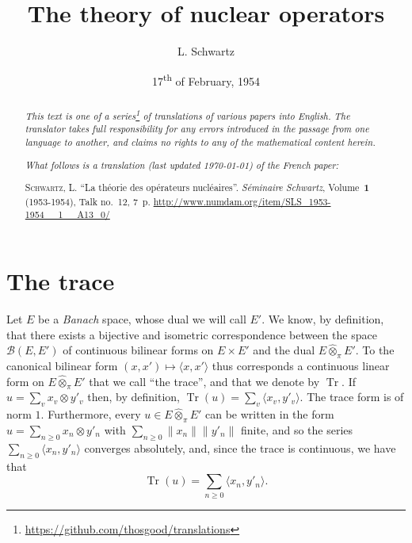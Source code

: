 \documentclass{article}
\title{The theory of nuclear operators}
\author{L. Schwartz}
\date{17\textsuperscript{th} of February, 1954}
\theoremstyle{plain}
\theoremstyle{definition}
\newcommand{\BB}{\mathcal{B}}
\newcommand{\cprojotimes}{\widehat{\otimes}_\pi}
\newcommand{\tr}{\operatorname{Tr}}
\renewcommand{\geq}{\geqslant}
\newcommand{\oldpage}[1]{\marginpar{\footnotesize$\Big\vert$ \textit{p.~#1}}}
\begin{document}
\maketitle
\thispagestyle{fancy}

\renewcommand{\abstractname}{Translator's note.}

\begin{abstract}
  \renewcommand*{\thefootnote}{\fnsymbol{footnote}}
  \emph{This text is one of a series\footnote{\url{https://github.com/thosgood/translations}} of translations of various papers into English.}
  \emph{The translator takes full responsibility for any errors introduced in the passage from one language to another, and claims no rights to any of the mathematical content herein.}
  
  \emph{What follows is a translation (last updated \today) of the French paper:}

  \medskip\noindent
  \textsc{Schwartz, L.}
  ``La th\'{e}orie des op\'{e}rateurs nucl\'{e}aires''.
  \emph{S\'{e}minaire Schwartz}, Volume~\textbf{1} (1953-1954), Talk no.~12, 7~p.
  {\footnotesize\url{http://www.numdam.org/item/SLS_1953-1954__1__A13_0/}}
\end{abstract}

\setcounter{footnote}{0}

\tableofcontents
\bigskip



\section{The trace}
\label{section1}

\oldpage{1}

Let $E$ be a \emph{Banach} space, whose dual we will call $E'$.
We know, by definition, that there exists a bijective and isometric correspondence between the space $\BB(E,E')$ of continuous bilinear forms on $E\times E'$ and the dual $E\cprojotimes E'$.
To the canonical bilinear form $(x,x')\mapsto\langle x,x'\rangle$ thus corresponds a continuous linear form on $E\cprojotimes E'$ that we call ``the trace'', and that we denote by $\tr$.
If $u=\sum_v x_v\otimes y'_v$ then, by definition, $\tr(u)=\sum_v\langle x_v,y'_v\rangle$.
The trace form is of norm $1$.
Furthermore, every $u\in E\cprojotimes E'$ can be written in the form $u=\sum_{n\geq0}x_n\otimes y'_n$ with $\sum_{n\geq0}\|x_n\|\|y'_n\|$ finite, and so the series $\sum_{n\geq0}\langle x_n,y'_n\rangle$ converges absolutely, and, since the trace is continuous, we have that
\[
  \tr(u) = \sum_{n\geq0} \langle x_n, y'_n \rangle.
\]
\end{document}
